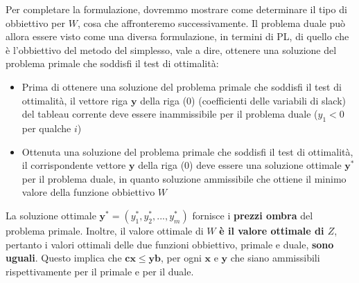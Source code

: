 \documentclass[12pt]{article}
\begin{document}
Per completare la formulazione, dovremmo mostrare come determinare il tipo di obbiettivo per $W$, cosa che affronteremo successivamente.
Il problema duale può allora essere visto come una diversa formulazione, in termini di PL, di quello che è l'obbiettivo del metodo del simplesso, vale a dire,
ottenere una soluzione del problema primale che soddisfi il test di ottimalità:
\begin{itemize}
    \item Prima di ottenere una soluzione del problema primale che soddisfi il test di ottimalità, il vettore riga $\boldsymbol{y}$ della riga (0) (coefficienti delle variabili di slack) del tableau corrente
    deve essere inammissibile per il problema duale ($y_1 < 0$ per qualche $i$)
    \item Ottenuta una soluzione del problema primale che soddisfi il test di ottimalità, il corrispondente vettore $\boldsymbol{y}$ della riga (0) deve essere una soluzione ottimale $\boldsymbol{y}^*$ per il problema duale,
    in quanto soluzione ammissibile che ottiene il minimo valore della funzione obbiettivo $W$
\end{itemize}
La soluzione ottimale $\boldsymbol{y}^* = (y_1^*, y_2^*, ..., y_m^*)$ fornisce i \textbf{prezzi ombra} del problema primale. Inoltre, il valore ottimale di $W$ \textbf{è il valore ottimale di $Z$}, pertanto i valori ottimali delle due funzioni obbiettivo,
primale e duale, \textbf{sono uguali}. Questo implica che $\boldsymbol{c}\boldsymbol{x} \leq \boldsymbol{y}\boldsymbol{b}$, per ogni $\boldsymbol{x}$ e $\boldsymbol{y}$ che siano ammissibili rispettivamente per il primale e per il duale.
\end{document}

